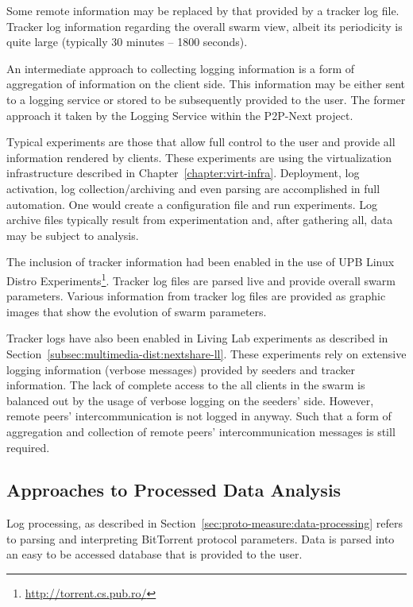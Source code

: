 Some remote information may be replaced by that provided by a tracker log
file. Tracker log information regarding the overall swarm view, albeit its
periodicity is quite large (typically 30 minutes -- 1800 seconds).

An intermediate approach to collecting logging information is a form of
aggregation of information on the client side. This information may be either
sent to a logging service or stored to be subsequently provided to the user.
The former approach it taken by the Logging Service within the P2P-Next
project.

Typical experiments are those that allow full control to the user and provide
all information rendered by clients. These experiments are using the
virtualization infrastructure described in Chapter~\ref{chapter:virt-infra}.
Deployment, log activation, log collection/archiving and even parsing are
accomplished in full automation. One would create a configuration file and run
experiments. Log archive files typically result from experimentation and, after
gathering all, data may be subject to analysis.

The inclusion of tracker information had been enabled in the use of UPB Linux
Distro Experiments\footnote{\url{http://torrent.cs.pub.ro/}}. Tracker log files are
parsed live and provide overall swarm parameters. Various information from
tracker log files are provided as graphic images that show the evolution of
swarm parameters.

Tracker logs have also been enabled in Living Lab experiments as described in
Section~\ref{subsec:multimedia-dist:nextshare-ll}. These experiments rely on
extensive logging information (verbose messages) provided by seeders and
tracker information. The lack of complete access to the all clients in the
swarm is balanced out by the usage of verbose logging on the seeders' side.
However, remote peers' intercommunication is not logged in anyway. Such that a
form of aggregation and collection of remote peers' intercommunication
messages is still required.

\subsection{Approaches to Processed Data Analysis}

Log processing, as described in
Section~\ref{sec:proto-measure:data-processing} refers to parsing and
interpreting BitTorrent protocol parameters. Data is parsed into an easy to be
accessed database that is provided to the user.

